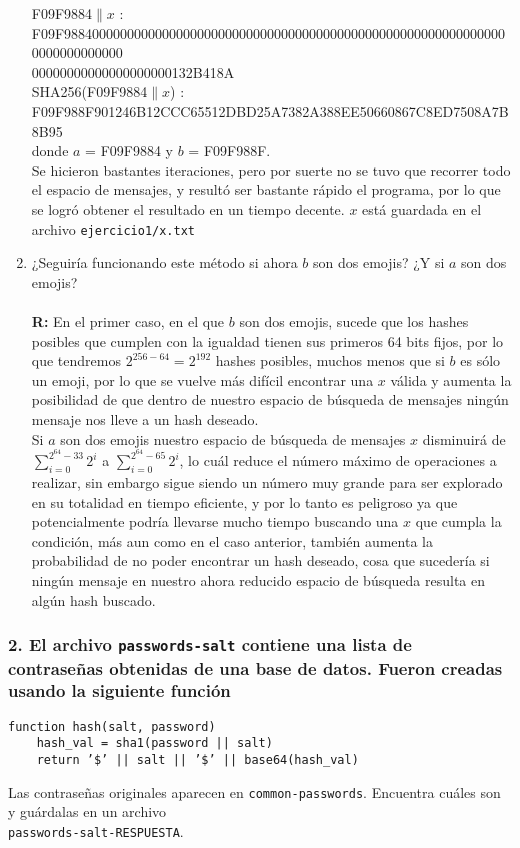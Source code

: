 \documentclass[14pt]{article}
\begin{document}
\begin{enumerate}[label=\alph*)]
  F09F9884$ \parallel x$ :  F09F9884000000000000000000000000000000000000000000000000000000000000000000000000\\00000000000000000000132B418A \\
  
  SHA256(F09F9884$\parallel x$) : F09F988F901246B12CCC65512DBD25A7382A388EE50660867C8ED7508A7B8B95 \\
  
donde $a$ = F09F9884 y $b$ = F09F988F. \\

Se hicieron bastantes iteraciones, pero por suerte no se tuvo que recorrer todo el espacio de mensajes, y resultó ser bastante rápido el programa, por lo que se logró obtener el resultado en un tiempo decente. $x$ está guardada en el archivo \texttt{ejercicio1/x.txt}
  
\item ¿Seguiría funcionando este método si ahora $b$ son dos emojis? ¿Y si $a$ son dos emojis? \\ \\
  \textbf{R:} En el primer caso, en el que $b$ son dos emojis, sucede que los hashes posibles que cumplen con la igualdad tienen sus primeros 64 bits fijos, por lo que tendremos $2^{256 - 64} = 2 ^ {192}$ hashes posibles, muchos menos que si $b$ es sólo un emoji, por lo que se vuelve más difícil encontrar una $x$ válida y aumenta la posibilidad de que dentro de nuestro espacio de búsqueda de mensajes ningún mensaje nos lleve a un hash deseado. \\

Si $a$ son dos emojis nuestro espacio de búsqueda de mensajes $x$ disminuirá de $\sum_{i = 0}^{2^{64} - 33}2^i$ a $\sum_{i = 0}^{2^{64} - 65}2^i$, lo cuál reduce el número máximo de operaciones a realizar, sin embargo sigue siendo un número muy grande para ser explorado en su totalidad en tiempo eficiente, y por lo tanto es peligroso ya que potencialmente podría llevarse mucho tiempo buscando una $x$ que cumpla la condición, más aun como en el caso anterior, también aumenta la probabilidad de no poder encontrar un hash deseado, cosa que sucedería si ningún mensaje en nuestro ahora reducido espacio de búsqueda resulta en algún hash buscado.

\end{enumerate}

\subsubsection*{2. El archivo \texttt{passwords-salt} contiene una lista de contraseñas obtenidas de una base de datos. Fueron creadas usando la siguiente función}
\begin{verbatim}
function hash(salt, password)
    hash_val = sha1(password || salt)
    return ’$’ || salt || ’$’ || base64(hash_val)
\end{verbatim}
Las contraseñas originales aparecen en \texttt{common-passwords}. Encuentra cuáles son y guárdalas en un archivo\\ \texttt{passwords-salt-RESPUESTA}. \\
\end{document}
